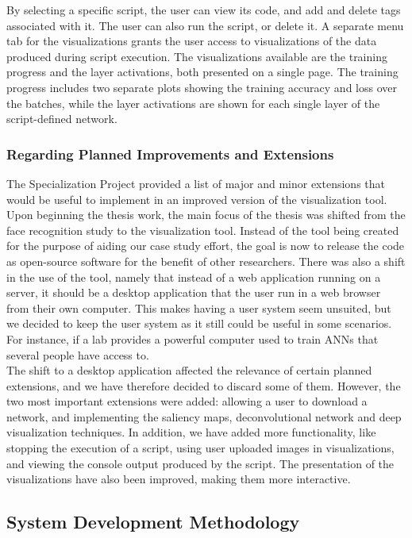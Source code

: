 \noindent By selecting a specific script, the user can view its code, and add and delete tags associated with it. The user can also run the script, or delete it. A separate menu tab for the visualizations grants the user access to visualizations of the data produced during script execution. The visualizations available are the training progress and the layer activations, both presented on a single page. The training progress includes two separate plots showing the training accuracy and loss over the batches, while the layer activations are shown for each single layer of the script-defined network.

\subsubsection{Regarding Planned Improvements and Extensions}

The Specialization Project provided a list of major and minor extensions that would be useful to implement in an improved version of the visualization tool. Upon beginning the thesis work, the main focus of the thesis was shifted from the face recognition study to the visualization tool. Instead of the tool being created for the purpose of aiding our case study effort, the goal is now to release the code as open-source software for the benefit of other researchers. There was also a shift in the use of the tool, namely that instead of a web application running on a server, it should be a desktop application that the user run in a web browser from their own computer. This makes having a user system seem unsuited, but we decided to keep the user system as it still could be useful in some scenarios. For instance, if a lab provides a powerful computer used to train ANNs that several people have access to. \\

\noindent The shift to a desktop application affected the relevance of certain planned extensions, and we have therefore decided to discard some of them. However, the two most important extensions were added: allowing a user to download a network, and implementing the saliency maps, deconvolutional network and deep visualization techniques. In addition, we have added more functionality, like stopping the execution of a script, using user uploaded images in visualizations, and viewing the console output produced by the script. The presentation of the visualizations have also been improved, making them more interactive.

\subsection{System Development Methodology}

